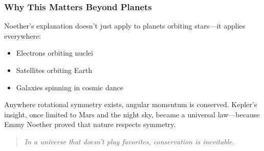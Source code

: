 \subsubsection*{Why This Matters Beyond Planets}

Noether’s explanation doesn’t just apply to planets orbiting stars—it applies everywhere:

\begin{itemize}
  \item Electrons orbiting nuclei
  \item Satellites orbiting Earth
  \item Galaxies spinning in cosmic dance
\end{itemize}

Anywhere rotational symmetry exists, angular momentum is conserved. Kepler’s insight, once limited to Mars and the night sky, became a universal law—because Emmy Noether proved that nature respects symmetry.

\begin{quote}
\textit{In a universe that doesn’t play favorites, conservation is inevitable.}
\end{quote}

